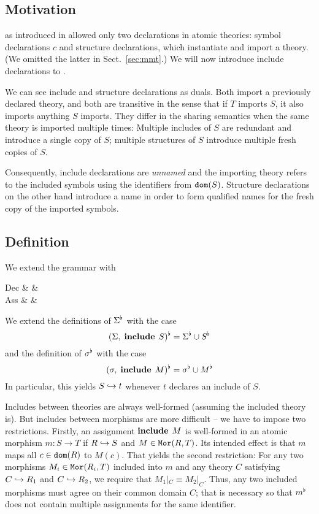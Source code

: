 \subsection{Motivation}

\mmt as introduced in \cite{RK:mmt:10} allowed only two declarations in atomic theories: symbol declarations $c$ and structure declarations, which instantiate and import a theory.
(We omitted the latter in Sect.~\ref{sec:mmt}.)
We will now introduce include declarations to \mmt.

We can see include and structure declarations as duals.
Both import a previously declared theory, and both are transitive in the sense that if $T$ imports $S$, it also imports anything $S$ imports.
They differ in the sharing semantics when the same theory is imported multiple times: Multiple includes of $S$ are redundant and introduce a single copy of $S$; multiple structures of $S$ introduce multiple fresh copies of $S$.

Consequently, include declarations are \emph{unnamed} and the importing theory refers to the included symbols using the identifiers from $\mathtt{dom}(S)$.
Structure declarations on the other hand introduce a name in order to form qualified names for the fresh copy of the imported symbols.

\subsection{Definition}

We extend the \mmt grammar with
\begin{grammar}
  Dec &  &  \\
  Ass &  & 
\end{grammar}

We extend the definitions of $\Sigma^\flat$ with the case
  \[(\Sigma,\;\operatorname{\mathbf{include}}{\;S})^\flat = \Sigma^\flat\cup S^\flat\]
and the definition of $\sigma^\flat$ with the case
  \[(\sigma,\;\operatorname{\mathbf{include}}{\;M})^\flat=\sigma^\flat\cup M^\flat\]
In particular, this yields $S\hookrightarrow t$ whenever $t$ declares an include of $S$.

Includes between theories are always well-formed (assuming the included theory is).
But includes between morphisms are more difficult -- we have to impose two restrictions.
Firstly, an assignment $\operatorname{\mathbf{include}}{\;M}$ is well-formed in an atomic morphism $m:S\to T$ if $R\hookrightarrow S$ and $M\in\mathtt{Mor}(R,T)$.
Its intended effect is that $m$ maps all $c\in\mathtt{dom}(R)$ to $M(c)$.
That yields the second restriction: For any two morphisms $M_i\in\mathtt{Mor}(R_i,T)$ included into $m$ and any theory $C$ satisfying $C\hookrightarrow R_1$ and $C\hookrightarrow R_2$, we require that $M_1|_C\equiv M_2|_C$.
Thus, any two included morphisms must agree on their common domain $C$; that is necessary so that $m^\flat$ does not contain multiple assignments for the same identifier.

